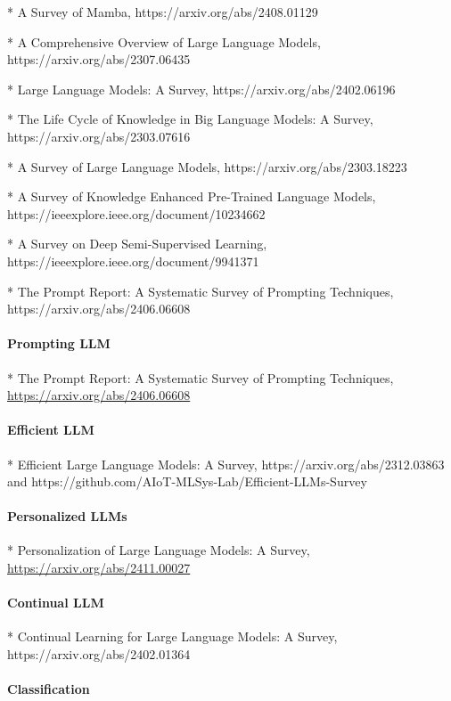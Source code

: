 * A Survey of Mamba, https://arxiv.org/abs/2408.01129

* A Comprehensive Overview of Large Language Models, https://arxiv.org/abs/2307.06435

* Large Language Models: A Survey, https://arxiv.org/abs/2402.06196

* The Life Cycle of Knowledge in Big Language Models: A Survey, https://arxiv.org/abs/2303.07616

* A Survey of Large Language Models, https://arxiv.org/abs/2303.18223

* A Survey of Knowledge Enhanced Pre-Trained Language Models, https://ieeexplore.ieee.org/document/10234662

* A Survey on Deep Semi-Supervised Learning, https://ieeexplore.ieee.org/document/9941371

* The Prompt Report: A Systematic Survey of Prompting Techniques, https://arxiv.org/abs/2406.06608

\paragraph{Prompting LLM}

* The Prompt Report: A Systematic Survey of Prompting Techniques, \url{https://arxiv.org/abs/2406.06608}

\paragraph{Efficient LLM}

* Efficient Large Language Models: A Survey, https://arxiv.org/abs/2312.03863 and https://github.com/AIoT-MLSys-Lab/Efficient-LLMs-Survey

\paragraph{Personalized LLMs}

* Personalization of Large Language Models: A Survey, \url{https://arxiv.org/abs/2411.00027}

\paragraph{Continual LLM}

* Continual Learning for Large Language Models: A Survey, https://arxiv.org/abs/2402.01364

\paragraph{Classification}

